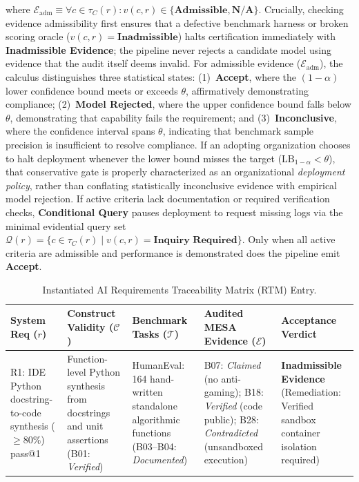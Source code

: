 \documentclass[runningheads]{llncs}
\begin{document}
where $\mathcal{E}_{\text{adm}} \equiv \forall c \in \tau_C(r) : v(c, r) \in \{\textbf{Admissible}, \textbf{N/A}\}$. Crucially, checking evidence admissibility first ensures that a defective benchmark harness or broken scoring oracle ($v(c, r) = \textbf{Inadmissible}$) halts certification immediately with \textbf{Inadmissible Evidence}; the pipeline never rejects a candidate model using evidence that the audit itself deems invalid. For admissible evidence ($\mathcal{E}_{\text{adm}}$), the calculus distinguishes three statistical states: (1)~\textbf{Accept}, where the $(1-\alpha)$ lower confidence bound meets or exceeds $\theta$, affirmatively demonstrating compliance; (2)~\textbf{Model Rejected}, where the upper confidence bound falls below $\theta$, demonstrating that capability fails the requirement; and (3)~\textbf{Inconclusive}, where the confidence interval spans $\theta$, indicating that benchmark sample precision is insufficient to resolve compliance. If an adopting organization chooses to halt deployment whenever the lower bound misses the target ($\text{LB}_{1-\alpha} < \theta$), that conservative gate is properly characterized as an organizational \emph{deployment policy}, rather than conflating statistically inconclusive evidence with empirical model rejection. If active criteria lack documentation or required verification checks, \textbf{Conditional Query} pauses deployment to request missing logs via the minimal evidential query set $\mathcal{Q}(r) = \{ c \in \tau_C(r) \mid v(c, r) = \textbf{Inquiry Required} \}$. Only when all active criteria are admissible and performance is demonstrated does the pipeline emit \textbf{Accept}.

\begin{table}[t]
\caption{Instantiated AI Requirements Traceability Matrix (RTM) Entry.}
\label{tab:rtm_example}
\centering
\scriptsize
\setlength{\tabcolsep}{3pt}
\begin{tabularx}{\textwidth}{@{}l>{\raggedright\arraybackslash}p{2.6cm}>{\raggedright\arraybackslash}p{2.6cm}>{\raggedright\arraybackslash}X>{\raggedright\arraybackslash}p{2.4cm}@{}}
\toprule
\textbf{System Req ($r$)} & \textbf{Construct Validity ($\mathcal{C}$)} & \textbf{Benchmark Tasks ($\mathcal{T}$)} & \textbf{Audited MESA Evidence ($\mathcal{E}$)} & \textbf{Acceptance Verdict} \\
\midrule
R1: IDE Python docstring-to-code synthesis ($\ge 80\%$) pass@1 & Function-level Python synthesis from docstrings and unit assertions (B01: \emph{Verified}) & HumanEval: 164 hand-written standalone algorithmic functions (B03--B04: \emph{Documented}) & B07: \emph{Claimed} (no anti-gaming); B18: \emph{Verified} (code public); B28: \emph{Contradicted} (unsandboxed execution) & \textbf{Inadmissible Evidence} (Remediation: Verified sandbox container isolation required) \\
\bottomrule
\end{tabularx}
\end{table}
\end{document}
